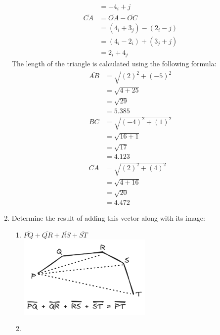 \documentclass[12pt,titlepage]{article}
\begin{document}
\begin{enumerate}
{\begin{align*}
                            &= -4_i + j\\
            \overline{CA} &= \overline{OA} - \overline{OC} \\
                            &= (4_i + 3_j) - (2_i - j) \\
                            &= (4_i - 2_i) + (3_j + j) \\
                            &= 2_i + 4_j
        \end{align*}
        The length of the triangle is calculated using the following formula:
        \begin{align*}
            \overline{AB} &= \sqrt{(2)^2 + (-5)^2} \\
                          &= \sqrt{4 + 25} \\
                          &= \sqrt{29} \\
                          &= 5.385 \\
            \overline{BC} &= \sqrt{(-4)^2 + (1)^2} \\
                          &= \sqrt{16 + 1} \\
                          &= \sqrt{17} \\
                          &= 4.123 \\
            \overline{CA} &= \sqrt{(2)^2 + (4)^2} \\
                          &= \sqrt{4 + 16} \\
                          &= \sqrt{20} \\
                          &= 4.472
        \end{align*}
    }
    \pagebreak
    \item {
        Determine the result of adding this vector along with its image:
        \begin{enumerate}
           \item {
                $\overline{PQ} + \overline{QR} + \overline{RS} + \overline{ST}$\\
                \includegraphics[height=4cm]{./images/vector-1.png}
           }
           \item {
}
\end{enumerate}}
\end{enumerate}
\end{document}

